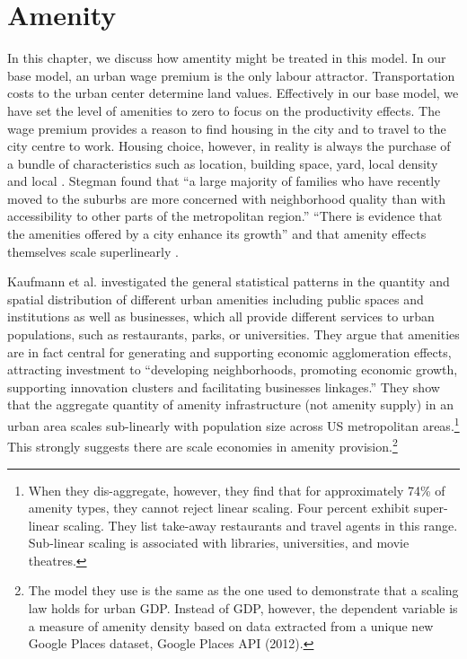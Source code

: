 \chapter{Amenity}\label{chapter-amenity}

In this chapter, we discuss how amentity might be treated in this model. 
In our base model,  an urban wage premium is the only labour attractor. Transportation costs to the urban center determine land values. Effectively in our base model, we have set the level of amenities to zero  to focus on the productivity effects. The wage premium provides a reason to find housing in the city and to travel to the city centre to work. Housing choice, however, in reality is always the purchase of a bundle of characteristics such as location, building space, yard, local density and local . Stegman  found that ``a large majority of families who have recently moved to the suburbs are more concerned with neighborhood quality than with accessibility to other parts of the metropolitan region.'' 
``There is evidence that the amenities offered by a city enhance its growth'' \cite{clarkAmenitiesDriveUrban2002, falckPhantomOperaCultural2011} and that amenity effects themselves scale superlinearly \cite{kraemerCulturalSustainabilityUS2022}.

Kaufmann et al. \cite{kaufmannScalingUrbanAmenities2022} investigated the general statistical patterns in the quantity and spatial distribution of different urban amenities including public spaces and institutions as well as businesses, which all provide different services to urban populations, such as restaurants, parks, or universities.  They argue that amenities are in fact central for generating and supporting economic agglomeration effects, attracting investment to ``developing neighborhoods, promoting economic growth, supporting innovation clusters and facilitating businesses linkages.'' 
They show that the aggregate quantity of amenity infrastructure (not amenity supply)  in an urban area scales sub-linearly with population size across US metropolitan areas.\footnote{When they dis-aggregate, however, they find that for approximately 74\% of amenity types, they cannot reject linear scaling. Four percent exhibit super-linear scaling. They list take-away restaurants and travel agents in this range. Sub-linear scaling is associated with libraries, universities, and movie theatres.} This strongly suggests there are scale economies in amenity provision.\footnote{The model they use is the same as the one used to demonstrate that a scaling law holds for urban GDP. Instead of GDP, however, the dependent variable is a measure of amenity density based on data extracted from a unique new Google Places dataset, Google Places API (2012).} 


